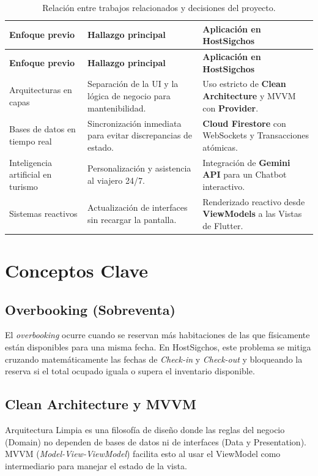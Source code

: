 \documentclass[12pt,letterpaper]{report}
\newcommand{\tech}[1]{\textbf{#1}}
\begin{document}
\begin{longtable}{p{3.4cm}p{5.1cm}p{5.4cm}}
\caption{Relación entre trabajos relacionados y decisiones del proyecto.}\\
\toprule
\textbf{Enfoque previo} & \textbf{Hallazgo principal} & \textbf{Aplicación en HostSigchos}\\
\midrule
\endfirsthead
\toprule
\textbf{Enfoque previo} & \textbf{Hallazgo principal} & \textbf{Aplicación en HostSigchos}\\
\midrule
\endhead
Arquitecturas en capas \cite{cleanArchitecture} & Separación de la UI y la lógica de negocio para mantenibilidad. & Uso estricto de \tech{Clean Architecture} y MVVM con \tech{Provider}.\\
Bases de datos en tiempo real & Sincronización inmediata para evitar discrepancias de estado. & \tech{Cloud Firestore} con WebSockets y Transacciones atómicas.\\
Inteligencia artificial en turismo & Personalización y asistencia al viajero 24/7. & Integración de \tech{Gemini API} para un Chatbot interactivo.\\
Sistemas reactivos & Actualización de interfaces sin recargar la pantalla. & Renderizado reactivo desde \tech{ViewModels} a las Vistas de Flutter.\\
\bottomrule
\end{longtable}

\section{Conceptos Clave}
\subsection{Overbooking (Sobreventa)}
El \textit{overbooking} ocurre cuando se reservan más habitaciones de las que físicamente están disponibles para una misma fecha. En HostSigchos, este problema se mitiga cruzando matemáticamente las fechas de \textit{Check-in} y \textit{Check-out} y bloqueando la reserva si el total ocupado iguala o supera el inventario disponible.

\subsection{Clean Architecture y MVVM}
Arquitectura Limpia es una filosofía de diseño donde las reglas del negocio (Domain) no dependen de bases de datos ni de interfaces (Data y Presentation). MVVM (\textit{Model-View-ViewModel}) facilita esto al usar el ViewModel como intermediario para manejar el estado de la vista.
\end{document}

